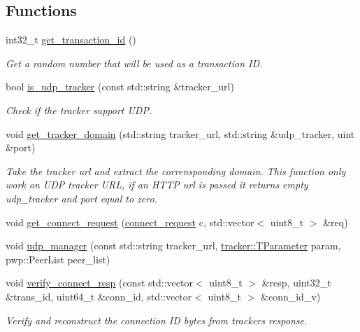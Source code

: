 \subsection*{Functions}
\begin{DoxyCompactItemize}
\item 
int32\+\_\+t \hyperlink{namespacet__udp_a8ff6ed3deaee00a35cc7afd4b37456d6}{get\+\_\+transaction\+\_\+id} ()
\begin{DoxyCompactList}\small\item\em Get a random number that will be used as a transaction ID. \end{DoxyCompactList}\item 
bool \hyperlink{namespacet__udp_af6fbd38370a6f5f7d8520144de7104c4}{is\+\_\+udp\+\_\+tracker} (const std\+::string \&tracker\+\_\+url)
\begin{DoxyCompactList}\small\item\em Check if the tracker support U\+DP. \end{DoxyCompactList}\item 
void \hyperlink{namespacet__udp_a0e87c0151a7bceaace19434206566199}{get\+\_\+tracker\+\_\+domain} (std\+::string tracker\+\_\+url, std\+::string \&udp\+\_\+tracker, uint \&port)
\begin{DoxyCompactList}\small\item\em Take the tracker url and extract the corrensponding domain. This function only work on U\+DP tracker U\+RL, if an H\+T\+TP url is passed it returns empty udp\+\_\+tracker and port equal to zero. \end{DoxyCompactList}\item 
void \hyperlink{namespacet__udp_adb2cdd5090cae67a7de482be4e281f23}{get\+\_\+connect\+\_\+request} (\hyperlink{structt__udp_1_1connect__request}{connect\+\_\+request} c, std\+::vector$<$ uint8\+\_\+t $>$ \&req)
\item 
void \hyperlink{namespacet__udp_af26a254f05566a7066b6930ad998a656}{udp\+\_\+manager} (const std\+::string tracker\+\_\+url, \hyperlink{structtracker_1_1TParameter}{tracker\+::\+T\+Parameter} param, pwp\+::\+Peer\+List peer\+\_\+list)
\item 
void \hyperlink{namespacet__udp_af6b2788d8ce8ab98f367838a7e3b7b09}{verify\+\_\+connect\+\_\+resp} (const std\+::vector$<$ uint8\+\_\+t $>$ \&resp, uint32\+\_\+t \&trans\+\_\+id, uint64\+\_\+t \&conn\+\_\+id, std\+::vector$<$ uint8\+\_\+t $>$ \&conn\+\_\+id\+\_\+v)
\begin{DoxyCompactList}\small\item\em Verify and reconstruct the connection ID bytes from tracker\textquotesingle{}s response. \end{DoxyCompactList}\item 

\end{DoxyCompactItemize}
